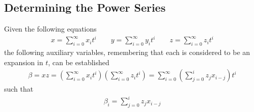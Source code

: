\documentclass{article}
\begin{document}
\subsection{Determining the Power Series}
Given the following equations
    \begin{align} 
        x=\sum_{i=0}^\infty x_it^i\quad\quad y=\sum_{i=0}^\infty y_it^i\quad\quad z=\sum_{i=0}^\infty z_it^i
    \end{align}
the following auxiliary variables, remembering that each is considered to be an expansion in $t$, can be established    
    \begin{align}
            \beta=xz=\left(\sum_{i=0}^\infty x_it^i\right)\left(\sum_{i=0}^\infty z_it^i\right)=\sum_{i=0}^\infty\left(\sum_{j=0}^i z_jx_{i-j} \right)t^i
      \end{align}
such that 
    \begin{align}
        \beta_i=\sum_{j=0}^i z_jx_{i-j} 
    \end{align}
\end{document}
